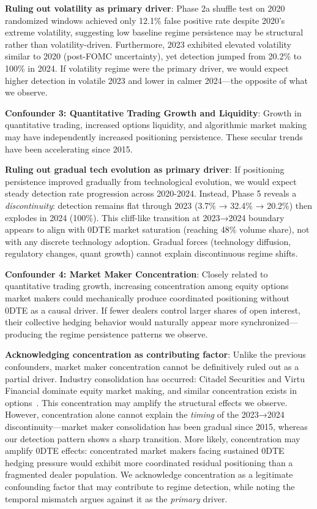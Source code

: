 \noindent\textbf{Ruling out volatility as primary driver}: Phase 2a shuffle test on 2020 randomized windows achieved only 12.1\% false positive rate despite 2020's extreme volatility, suggesting low baseline regime persistence may be structural rather than volatility-driven. Furthermore, 2023 exhibited elevated volatility similar to 2020 (post-FOMC uncertainty), yet detection jumped from 20.2\% to 100\% in 2024. If volatility regime were the primary driver, we would expect higher detection in volatile 2023 and lower in calmer 2024—the opposite of what we observe.

\vspace{0.2cm}

\noindent\textbf{Confounder 3: Quantitative Trading Growth and Liquidity}: Growth in quantitative trading, increased options liquidity, and algorithmic market making may have independently increased positioning persistence. These secular trends have been accelerating since 2015.

\noindent\textbf{Ruling out gradual tech evolution as primary driver}: If positioning persistence improved gradually from technological evolution, we would expect steady detection rate progression across 2020-2024. Instead, Phase 5 reveals a \textit{discontinuity}: detection remains flat through 2023 (3.7\% → 32.4\% → 20.2\%) then explodes in 2024 (100\%). This cliff-like transition at 2023→2024 boundary appears to align with 0DTE market saturation (reaching 48\% volume share), not with any discrete technology adoption. Gradual forces (technology diffusion, regulatory changes, quant growth) cannot explain discontinuous regime shifts.

\vspace{0.2cm}

\noindent\textbf{Confounder 4: Market Maker Concentration}: Closely related to quantitative trading growth, increasing concentration among equity options market makers could mechanically produce coordinated positioning without 0DTE as a causal driver. If fewer dealers control larger shares of open interest, their collective hedging behavior would naturally appear more synchronized—producing the regime persistence patterns we observe.

\noindent\textbf{Acknowledging concentration as contributing factor}: Unlike the previous confounders, market maker concentration cannot be definitively ruled out as a partial driver. Industry consolidation has occurred: Citadel Securities and Virtu Financial dominate equity market making, and similar concentration exists in options~\citep{cboe2024market}. This concentration may amplify the structural effects we observe. However, concentration alone cannot explain the \textit{timing} of the 2023→2024 discontinuity—market maker consolidation has been gradual since 2015, whereas our detection pattern shows a sharp transition. More likely, concentration may amplify 0DTE effects: concentrated market makers facing sustained 0DTE hedging pressure would exhibit more coordinated residual positioning than a fragmented dealer population. We acknowledge concentration as a legitimate confounding factor that may contribute to regime detection, while noting the temporal mismatch argues against it as the \textit{primary} driver.


